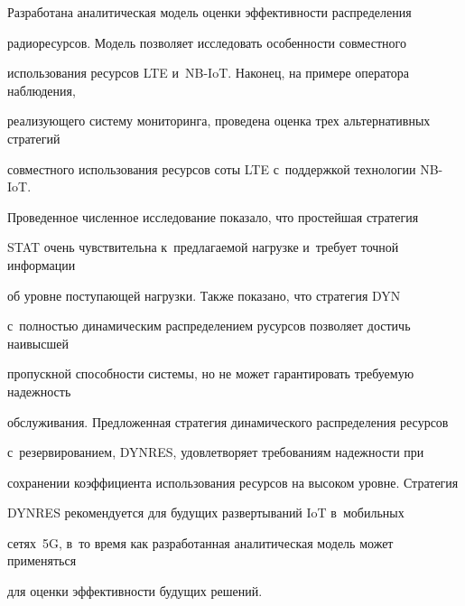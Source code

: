 Разработана аналитическая модель оценки эффективности распределения 


радиоресурсов. Модель позволяет исследовать особенности совместного 


использования ресурсов LTE и~NB-IoT. Наконец, на примере оператора наблюдения, 


реализующего систему мониторинга, проведена оценка трех альтернативных стратегий 


совместного использования ресурсов соты LTE с~поддержкой технологии NB-IoT.





Проведенное численное исследование показало, что простейшая стратегия 


{STAT} очень чувствительна к~предлагаемой нагрузке и~требует точной информации 


об уровне поступающей нагрузки. Также показано, что стратегия  {DYN} 


с~полностью динамическим распределением русурсов позволяет достичь наивысшей 


пропускной способности системы, но не может гарантировать требуемую надежность 


обслуживания. Предложенная стратегия динамического распределения ресурсов 


с~резервированием,  \mbox{DYNRES}, удовлетворяет требованиям надежности при 


сохранении коэффициента использования ресурсов на высоком уровне. Стратегия 


\mbox{DYNRES} рекомендуется для будущих развертываний IoT в~мобильных 


сетях~5G, в~то время как разработанная аналитическая модель может применяться 


для оценки эффективности будущих решений.





\vspace*{-7pt}






